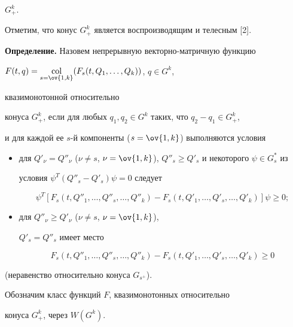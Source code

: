 $G^k_+$. 


Отметим, что конус $G^k_+$ является воспроизводящим и телесным [2]. 


\medskip 


 


{\bf Определение.} Назовем непрерывную векторно-матричную функцию 


$F(t,q)=\linebreak


\col\limits_{s=\ov{1,k}}(F_s(t,Q_1,\dotsc,Q_k))$, $q\in G^k$, 


квазимонотонной относительно 


конуса $G^k_+$, если для любых $q_1,q_2\in G^k$ таких, что $q_2-q_1\in 


G^k_+$, 


и для каждой ее $s$-й компоненты ($s=\ov{1,k}$) выполняются условия 


\begin{itemize} 


\item[1)] для $Q'_\nu=Q''_\nu$ ($\nu\ne s$, $\nu=\ov{1,k}$), $Q''_s\ge 


Q'_s$ и некоторого $\psi\in G^*_s$ из  


условия $\psi^T(Q''_s-Q'_s)\psi=0$ следует 


$$ 


\psi^T[F_s(t,Q''_1,\dotsc,Q''_s,\dotsc,Q''_k)- 


F_s(t,Q'_1,\dotsc,Q'_s,\dotsc,Q'_k)]\psi\ge0; 


$$ 


\item[2)] для $Q''_\nu\ge Q'_\nu$ ($\nu\ne s$, $\nu=\ov{1,k}$), 


$Q'_s=Q''_s$ имеет место 


$$ 


F_s(t,Q''_1,\dotsc,Q''_s,\dotsc,Q''_k)- 


F_s(t,Q'_1,\dotsc,Q'_s,\dotsc,Q'_k)\ge0 


$$ 


\end{itemize} 


(неравенство относительно конуса $G_{s^+}$).  


\medskip 


 


Обозначим класс функций $F$, квазимонотонных относительно 


конуса $G^k_+$, через $W(G^k)$. 


